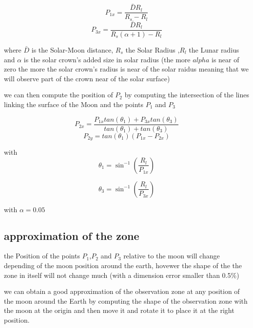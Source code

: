 \documentclass{article} %
\begin{document}
		$$	
		P_{1x}=\frac{\bar{D}R_l}{R_s-R_l}
		$$ 
		$$	
		P_{3x}=\frac{\bar{D}R_l}{R_s(\alpha+1)-R_l}
		$$
		
		where $\bar{D}$ is the Solar-Moon distance, $R_s$ the Solar Radius ,$R_l$ the Lunar radius and $\alpha$ is the solar crown's added size in solar radius (the more $alpha$ is near of zero the more the solar crown's radius is near of the solar raidus meaning that we will observe part of the crown near of the solar surface)
		
		we can then compute the position of $P_2$ by computing the intersection of the lines linking the surface of the Moon and the points $P_1$ and $P_3$
		
		
		$$
		P_{2x}=\frac{P_{1x}tan(\theta_1) + P_{3x}tan(\theta_3)}{tan(\theta_1) + tan(\theta_3)}
		$$
		$$
		P_{2y}=tan(\theta_1)(P_{1x}-P_{2x})
		$$
		
		with
		$$
		\theta_1=\sin^{-1}\left(\frac{R_l}{P_{1x}}\right)
		$$
		
		$$
		\theta_3=\sin^{-1}\left(\frac{R_l}{P_{3x}}\right)
		$$
		
		with $\alpha=0.05$
		
		\subsection{approximation of the zone}
		the Position of the points $P_1$,$P_2$ and $P_3$ relative to the moon will change depending of the moon position around the earth, hovewer the shape of the the zone in itself will not change much (with a dimension error smaller than 0.5\%)
		
		
		we can obtain a good approximation of the observation zone at any position of the moon around the Earth by computing the shape of the observation zone with the moon at the origin and then move it and rotate it to place it at the right position.
		
\end{document}
